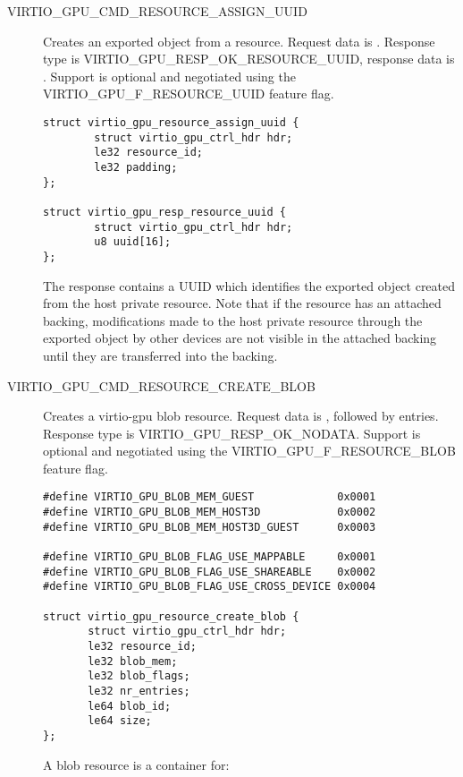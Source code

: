 \begin{description}
\item[VIRTIO_GPU_CMD_RESOURCE_ASSIGN_UUID] Creates an exported object from
  a resource. Request data is .  Response type is
  VIRTIO_GPU_RESP_OK_RESOURCE_UUID, response data is . Support is optional and negotiated
    using the VIRTIO_GPU_F_RESOURCE_UUID feature flag.

\begin{lstlisting}
struct virtio_gpu_resource_assign_uuid {
        struct virtio_gpu_ctrl_hdr hdr;
        le32 resource_id;
        le32 padding;
};

struct virtio_gpu_resp_resource_uuid {
        struct virtio_gpu_ctrl_hdr hdr;
        u8 uuid[16];
};
\end{lstlisting}

The response contains a UUID which identifies the exported object created from
the host private resource. Note that if the resource has an attached backing,
modifications made to the host private resource through the exported object by
other devices are not visible in the attached backing until they are transferred
into the backing.

\item[VIRTIO_GPU_CMD_RESOURCE_CREATE_BLOB] Creates a virtio-gpu blob
  resource. Request data is , followed by  entries. Response type is
  VIRTIO_GPU_RESP_OK_NODATA. Support is optional and negotiated
  using the VIRTIO_GPU_F_RESOURCE_BLOB feature flag.

\begin{lstlisting}
#define VIRTIO_GPU_BLOB_MEM_GUEST             0x0001
#define VIRTIO_GPU_BLOB_MEM_HOST3D            0x0002
#define VIRTIO_GPU_BLOB_MEM_HOST3D_GUEST      0x0003

#define VIRTIO_GPU_BLOB_FLAG_USE_MAPPABLE     0x0001
#define VIRTIO_GPU_BLOB_FLAG_USE_SHAREABLE    0x0002
#define VIRTIO_GPU_BLOB_FLAG_USE_CROSS_DEVICE 0x0004

struct virtio_gpu_resource_create_blob {
       struct virtio_gpu_ctrl_hdr hdr;
       le32 resource_id;
       le32 blob_mem;
       le32 blob_flags;
       le32 nr_entries;
       le64 blob_id;
       le64 size;
};

\end{lstlisting}

A blob resource is a container for:



\end{description}
